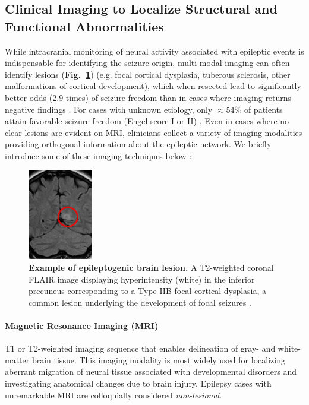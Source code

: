 \subsection{Clinical Imaging to Localize Structural and Functional Abnormalities}
While intracranial monitoring of neural activity associated with epileptic events is indispensable for identifying the seizure origin, multi-modal imaging can often identify lesions (\textbf{Fig.~\ref{typeIIfcd}}) (e.g. focal cortical dysplasia, tuberous sclerosis, other malformations of cortical development), which when resected lead to significantly better odds (2.9 times) of seizure freedom than in cases where imaging returns negative findings \cite{tellez-zenteno2010surgical}. For cases with unknown etiology, only $\approx$54\% of patients attain favorable seizure freedom (Engel score I or II) \cite{lee2005surgical}. Even in cases where no clear lesions are evident on MRI, clinicians collect a variety of imaging modalities providing orthogonal information about the epileptic network. We briefly introduce some of these imaging techniques below \cite{kuzniecky2002neuroimaging}:

\begin{figure}
\centering
\includegraphics[width=0.25\textwidth]{typeIIfcd_mri}
\caption[Example of brain lesion]{\textbf{Example of epileptogenic brain lesion.} A T2-weighted coronal FLAIR image displaying hyperintensity (white) in the inferior precuneus corresponding to a Type IIB focal cortical dysplasia, a common lesion underlying the development of focal seizures \cite{gaillard2015focal}.}
\label{typeIIfcd}
\end{figure}

\paragraph{Magnetic Resonance Imaging (MRI)}
T1 or T2-weighted imaging sequence that enables delineation of gray- and white-matter brain tissue. This imaging modality is most widely used for localizing aberrant migration of neural tissue associated with developmental disorders and investigating anatomical changes due to brain injury. Epilepsy cases with unremarkable MRI are colloquially considered \textit{non-lesional}.

